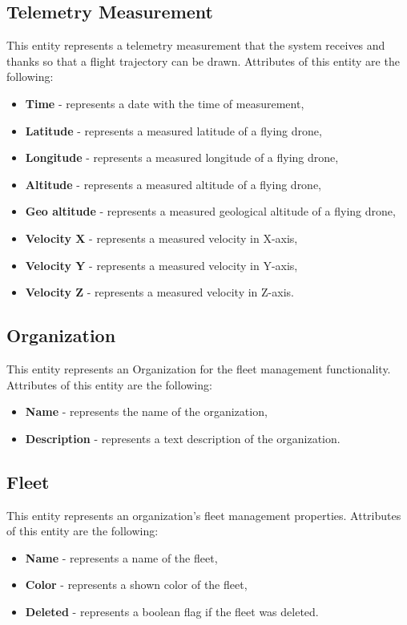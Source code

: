 \subsection{Telemetry Measurement}\label{subsec:telemetry-measurement}
This entity represents a telemetry measurement that the system receives and thanks so that a flight trajectory can be drawn.
Attributes of this entity are the following:
\begin{itemize}
    \item \textbf{Time} - represents a date with the time of measurement,
    \item \textbf{Latitude} - represents a measured latitude of a flying drone,
    \item \textbf{Longitude} - represents a measured longitude of a flying drone,
    \item \textbf{Altitude} - represents a measured altitude of a flying drone,
    \item \textbf{Geo altitude} - represents a measured geological altitude of a flying drone,
    \item \textbf{Velocity X} - represents a measured velocity in X-axis,
    \item \textbf{Velocity Y} - represents a measured velocity in Y-axis,
    \item \textbf{Velocity Z} - represents a measured velocity in Z-axis.
\end{itemize}

\subsection{Organization}\label{subsec:organization}
This entity represents an Organization for the fleet management functionality.
Attributes of this entity are the following:
\begin{itemize}
    \item \textbf{Name} - represents the name of the organization,
    \item \textbf{Description} - represents a text description of the organization.
\end{itemize}

\subsection{Fleet}\label{subsec:fleet}
This entity represents an organization's fleet management properties.
Attributes of this entity are the following:
\begin{itemize}
    \item \textbf{Name} - represents a name of the fleet,
    \item \textbf{Color} - represents a shown color of the fleet,
    \item \textbf{Deleted} - represents a boolean flag if the fleet was deleted.
\end{itemize}

